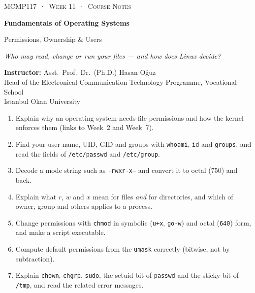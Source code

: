 \documentclass[11pt,a4paper]{article}
\newcommand{\cmd}[1]{\texttt{#1}}
\begin{document}
\thispagestyle{empty}
\begin{tcolorbox}[enhanced,colback=dark,colframe=dark,arc=0pt,boxrule=0pt,
  left=18pt,right=18pt,top=20pt,bottom=20pt,coltext=white]
{\small\color{mint}\textsc{MCMP117 \,·\, Week 11 \,·\, Course Notes}}\par\medskip
{\headfont\fontsize{26}{30}\selectfont\bfseries Fundamentals of Operating Systems}\par\medskip
{\large Permissions, Ownership \& Users}\par\smallskip
{\small\itshape\color{white!70} Who may read, change or run your files --- and how does Linux decide?}
\end{tcolorbox}

\vspace{0.4em}
{\small
\textbf{Instructor:} Asst.\ Prof.\ Dr.\ (Ph.D.) Hasan Oğuz\\
Head of the Electronical Communication Technology Programme, Vocational School\\
Istanbul Okan University\par}

\vspace{0.8em}
\begin{keyidea}
\begin{enumerate}[leftmargin=1.4em]
  \item Explain why an operating system needs file permissions and how the kernel enforces them (links to Week~2 and Week~7).
  \item Find your user name, UID, GID and groups with \cmd{whoami}, \cmd{id} and \cmd{groups}, and read the fields of \texttt{/etc/passwd} and \texttt{/etc/group}.
  \item Decode a mode string such as \texttt{-rwxr-x---} and convert it to octal ($750$) and back.
  \item Explain what $r$, $w$ and $x$ mean for files \emph{and} for directories, and which of owner, group and others applies to a process.
  \item Change permissions with \cmd{chmod} in symbolic (\texttt{u+x}, \texttt{go-w}) and octal (\texttt{640}) form, and make a script executable.
  \item Compute default permissions from the \cmd{umask} correctly (bitwise, not by subtraction).
  \item Explain \cmd{chown}, \cmd{chgrp}, \cmd{sudo}, the setuid bit of \cmd{passwd} and the sticky bit of \texttt{/tmp}, and read the related error messages.
\end{enumerate}
\end{keyidea}
\end{document}
